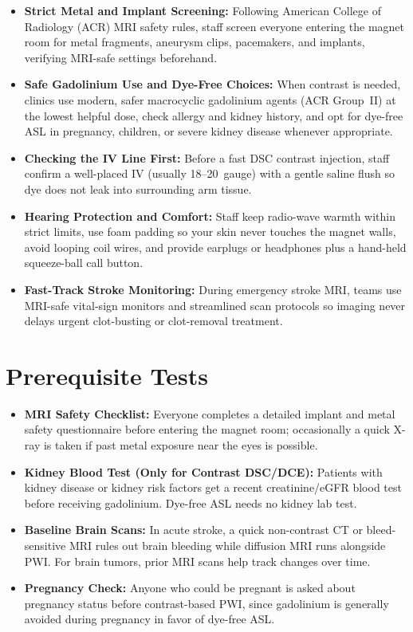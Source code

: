 \begin{itemize}
    \item \textbf{Strict Metal and Implant Screening:} Following American College of Radiology (ACR) MRI safety rules, staff screen everyone entering the magnet room for metal fragments, aneurysm clips, pacemakers, and implants, verifying MRI-safe settings beforehand.
    \item \textbf{Safe Gadolinium Use and Dye-Free Choices:} When contrast is needed, clinics use modern, safer macrocyclic gadolinium agents (ACR Group~II) at the lowest helpful dose, check allergy and kidney history, and opt for dye-free ASL in pregnancy, children, or severe kidney disease whenever appropriate.
    \item \textbf{Checking the IV Line First:} Before a fast DSC contrast injection, staff confirm a well-placed IV (usually 18--20~gauge) with a gentle saline flush so dye does not leak into surrounding arm tissue.
    \item \textbf{Hearing Protection and Comfort:} Staff keep radio-wave warmth within strict limits, use foam padding so your skin never touches the magnet walls, avoid looping coil wires, and provide earplugs or headphones plus a hand-held squeeze-ball call button.
    \item \textbf{Fast-Track Stroke Monitoring:} During emergency stroke MRI, teams use MRI-safe vital-sign monitors and streamlined scan protocols so imaging never delays urgent clot-busting or clot-removal treatment.
\end{itemize}

\section{Prerequisite Tests}

\begin{itemize}
    \item \textbf{MRI Safety Checklist:} Everyone completes a detailed implant and metal safety questionnaire before entering the magnet room; occasionally a quick X-ray is taken if past metal exposure near the eyes is possible.
    \item \textbf{Kidney Blood Test (Only for Contrast DSC/DCE):} Patients with kidney disease or kidney risk factors get a recent creatinine/eGFR blood test before receiving gadolinium. Dye-free ASL needs no kidney lab test.
    \item \textbf{Baseline Brain Scans:} In acute stroke, a quick non-contrast CT or bleed-sensitive MRI rules out brain bleeding while diffusion MRI runs alongside PWI. For brain tumors, prior MRI scans help track changes over time.
    \item \textbf{Pregnancy Check:} Anyone who could be pregnant is asked about pregnancy status before contrast-based PWI, since gadolinium is generally avoided during pregnancy in favor of dye-free ASL.
\end{itemize}

